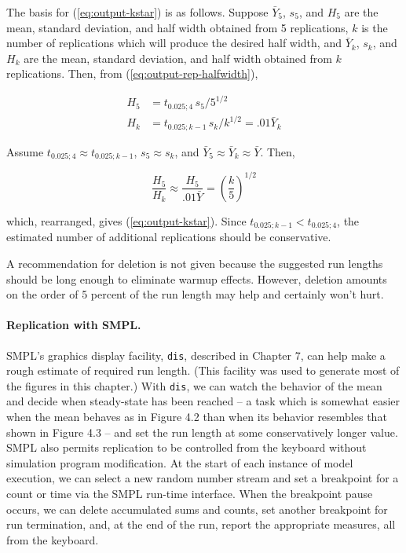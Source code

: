 The basis for (\ref{eq:output-kstar}) is as follows. Suppose $\bar{Y}_5$, $s_5$, and
$H_5$ are the mean, standard deviation, and half width obtained from 5
replications, $k$ is the number of replications which will produce the desired
half width, and $\bar{Y}_k$, $s_k$, and $H_k$ are the mean, standard deviation, and
half width obtained from $k$ replications. Then, from
(\ref{eq:output-rep-halfwidth}),

\begin{align*}
H_5 &= t_{0.025;4}\, s_5/5^{1/2} \\
H_k &= t_{0.025;k-1}\, s_k/k^{1/2} = .01\bar{Y}_k
\end{align*}

Assume $t_{0.025;4} \approx t_{0.025;k-1}$, $s_5 \approx s_k$, and $\bar{Y}_5 \approx \bar{Y}_k \approx \bar{Y}$. Then,

\[ \frac{H_5}{H_k} \approx \frac{H_5}{.01\bar{Y}} = \left(\frac{k}{5}\right)^{1/2} \]

which, rearranged, gives (\ref{eq:output-kstar}). Since
$t_{0.025;k-1} < t_{0.025;4}$, the estimated number of additional replications
should be conservative.

A recommendation for deletion is not given because the suggested run lengths
should be long enough to eliminate warmup effects. However, deletion amounts
on the order of 5 percent of the run length may help and certainly won't hurt.

\paragraph{Replication with SMPL.}
SMPL's graphics display facility, \texttt{dis}, described in Chapter 7, can help
make a rough estimate of required run length. (This facility was used to
generate most of the figures in this chapter.) With \texttt{dis}, we can watch the
behavior of the mean and decide when steady-state has been reached -- a task
which is somewhat easier when the mean
\noindent behaves as in Figure 4.2 than when
its behavior resembles that shown in Figure 4.3 -- and set the run length at
some conservatively longer value. SMPL also permits replication to be
controlled from the keyboard without simulation program modification. At the
start of each instance of model execution, we can select a new random number
stream and set a breakpoint for a count or time via the SMPL run-time
interface. When the breakpoint pause occurs, we can delete accumulated sums
and counts, set another breakpoint for run termination, and, at the end of the
run, report the appropriate measures, all from the keyboard.

